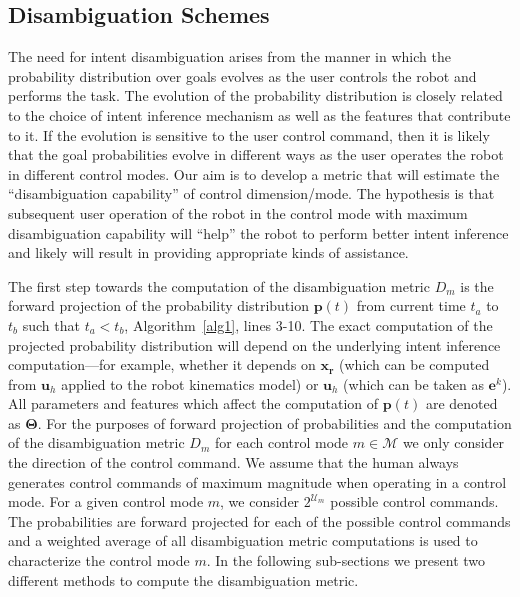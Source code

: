 \documentclass[conference]{IEEEtran}
\begin{document}
\subsection{Disambiguation Schemes}\label{ssec:disamb}

The need for intent disambiguation arises from the manner in which the probability distribution over goals evolves as the user controls the robot and performs the task. The evolution of the probability distribution is closely related to the choice of intent inference mechanism as well as the features that contribute to it. If the evolution is sensitive to the user control command, then it is likely that the goal probabilities evolve in different ways as the user operates the robot in different control modes. Our aim is to develop a metric that will estimate the ``disambiguation capability'' of control dimension/mode. The hypothesis is that subsequent user operation of the robot in the control mode with maximum disambiguation capability will ``help'' the robot to perform better intent inference and likely will result in providing appropriate kinds of assistance. 


The first step towards the computation of the disambiguation metric $D_m$ is the forward projection of the probability distribution $\boldsymbol{p}(t)$ from current time $t_a$ to $t_b$ such that $t_a < t_b$, Algorithm~\ref{alg1}, lines 3-10.  The exact computation of the projected probability distribution will depend on the underlying intent inference computation---for example, whether it depends on $\boldsymbol{x_r}$ (which can be computed from $\boldsymbol{u}_h$ applied to the robot kinematics model) or $\boldsymbol{u}_h$ (which can be taken as $\boldsymbol{e}^k$). All parameters and features which affect the computation of $\boldsymbol{p}(t)$ are denoted as $\boldsymbol{\Theta}$. For the purposes of forward projection of probabilities and the computation of the disambiguation metric $D_m$ for each control mode $m \in \mathcal{M}$ we only consider the direction of the control command. We assume that the human always generates control commands of maximum magnitude when operating in a control mode. For a given control mode $m$, we consider $2^{\mathcal{U}_{m}}$ possible control commands. The probabilities are forward projected for each of the possible control commands and a weighted average of all disambiguation metric computations is used to characterize the control mode $m$. In the following sub-sections we present two different methods to compute the disambiguation metric. 
\end{document}
